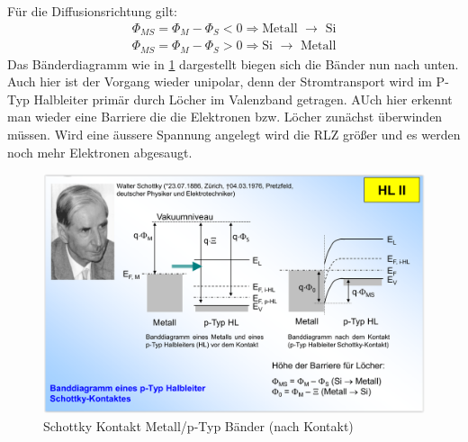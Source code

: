 \documentclass[12pt,a4paper]{report}%
\numberwithin{equation}{section}
\numberwithin{equation}{subsection}
\begin{document}
			Für die Diffusionsrichtung gilt:
			\begin{align}
			  \Phi_{MS} = \Phi_M - \Phi_S < 0 \Rightarrow \text{Metall } \rightarrow \text{ Si} \\
			  \Phi_{MS} = \Phi_M - \Phi_S > 0 \Rightarrow \text{Si } \rightarrow \text{ Metall}
			\end{align}
			Das Bänderdiagramm wie in \ref{fig:schottky_m-p_banddiagramm_nach} dargestellt biegen sich die Bänder nun nach unten. Auch hier ist der Vorgang wieder unipolar, denn der Stromtransport wird im P-Typ Halbleiter primär durch Löcher im Valenzband getragen. AUch hier erkennt man wieder eine Barriere die die Elektronen bzw. Löcher zunächst überwinden müssen. Wird eine äussere Spannung angelegt wird die RLZ größer und es werden noch mehr Elektronen abgesaugt.
		  \begin{figure}[H]
			  \centering
			  \captionsetup{justification=centering}
			  \includegraphics[width=0.6\linewidth]{schottky_banddiagramm_p.png}
			  \caption{Schottky Kontakt Metall/p-Typ Bänder (nach Kontakt) \protect\cite{MIKRO2}}
			  \label{fig:schottky_m-p_banddiagramm_nach}
			\end{figure}
			
\end{document}
